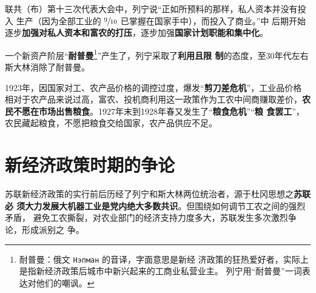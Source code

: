 \begin{enumerate}
  联共（布）第十三次代表大会中，列宁说“正如所预料的那样，私人资本并没有投入
  生产（因为全部工业的 $\sfrac{9}{10}$ 已掌握在国家手中），而投入了商业。”中
  后期开始逐步\textbf{加强对私人资本和富农的打压}，逐步加强\textbf{国家计划职能和集中化}。

  一个新资产阶层“\textbf{耐普曼}\footnote{耐普曼：俄文 \texttt{Нэпман} 的音译，字面意思是新经
    济政策的狂热爱好者，实际上是指新经济政策后城市中新兴起来的工商业私营业主。
    列宁用“耐普曼”一词表达对他们的嘲讽。}”产生了，列宁采取了\textbf{利用且限
    制}的态度，至30年代左右斯大林消除了耐普曼。

  1923年，因国家对工、农产品价格的调控过度，爆发“\textbf{剪刀差危机}”，工业品价格
  相对于农产品来说过高，富农、投机商利用这一政策作为工农中间商赚取差价，\textbf{农
    民不愿在市场出售粮食}。1927年末到1928年春又发生了“\textbf{粮食危机}”“\textbf{粮
    食罢工}”，农民藏起粮食，不愿把粮食交给国家，农产品供应不足。

\end{enumerate}

\section{新经济政策时期的争论}

苏联新经济政策的实行前后历经了列宁和斯大林两位统治者，源于杜冈思想之\textbf{苏联必
  须大力发展大机器工业是党内绝大多数共识}。但围绕如何调节工农之间的强烈矛盾，
避免工农撕裂，对农业部门的经济支持力度多大，苏联发生多次激烈争论，形成派别之
争。


